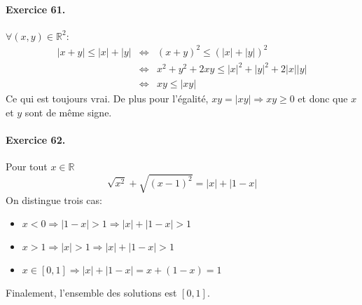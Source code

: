 \documentclass[a4paper,11pt]{article}
\begin{document}
\paragraph{Exercice 61.}  $\forall(x,y)\in\mathbb{R}^2$:
\begin{eqnarray}
  |x+y|\leq |x|+|y| &\Leftrightarrow& (x+y)^2\leq \left(|x|+|y|\right)^2 \nonumber \\
  &\Leftrightarrow& x^2+y^2 + 2xy\leq |x|^2+|y|^2 + 2|x||y| \nonumber \\
  &\Leftrightarrow& xy\leq |xy| \nonumber 
\end{eqnarray}
Ce qui est toujours vrai. De plus pour l'égalité, $xy=|xy| \Rightarrow xy\geq0$ et donc que $x$ et $y$ sont de même signe.

\paragraph{Exercice 62.} Pour tout $x\in\mathbb{R}$
\[
\sqrt{x^2} + \sqrt{(x-1)^2} = |x|+|1-x|
\]
On distingue trois cas:
\begin{itemize}
  \item $x<0 \Rightarrow |1-x| > 1 \Rightarrow |x|+|1-x| > 1$
  \item $x>1 \Rightarrow |x| > 1 \Rightarrow |x|+|1-x| > 1$
  \item $x\in[0,1]\Rightarrow |x|+|1-x|=x+(1-x)=1$
\end{itemize}
Finalement, l'ensemble des solutions est $[0,1]$.\\ \\
\end{document}
